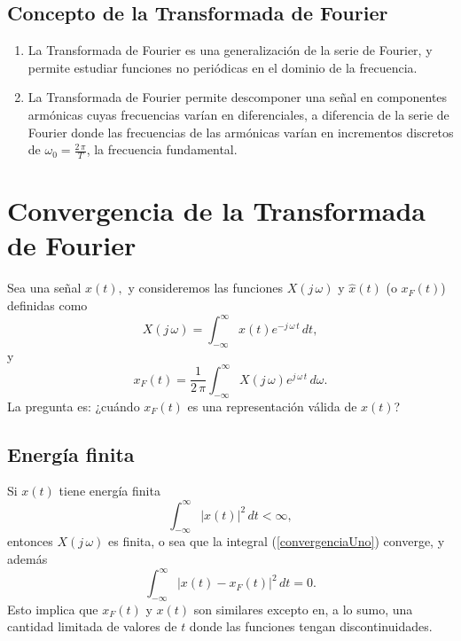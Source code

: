 \subsection{Concepto de la Transformada de Fourier}

\begin{enumerate}
	
	\item La Transformada de Fourier es una generalización de la serie de Fourier, y permite estudiar funciones no periódicas en el dominio de la frecuencia.
	\item La Transformada de Fourier permite descomponer una señal en componentes armónicas cuyas frecuencias varían en diferenciales, a diferencia de la serie de Fourier donde las frecuencias de las armónicas varían en incrementos discretos de $\omega_{0} = \frac{2 \, \pi}{T}$, la frecuencia fundamental.
\end{enumerate}

\section{Convergencia de la Transformada de Fourier}

Sea una señal $x(t),$ y consideremos las funciones $X(j \, \omega)$ y $\hat{x}(t)$ (o $x_F(t)$) definidas como 
\begin{equation}
	X(j \, \omega) = \int_{-\infty}^{\infty} x(t) e^{-j \, \omega \, t} \, dt,  \label{convergenciaUno}
\end{equation}
y 
\begin{equation}
	x_{F}(t) = \frac{1}{2 \, \pi} \int_{-\infty}^{\infty} X(j \, \omega) e^{j \, \omega \, t} \, d\omega .
\end{equation}
La pregunta es: ¿cuándo $x_{F}(t)$ es una representación válida de $x(t)$?

\subsection{Energía finita}

Si $x(t)$ tiene energía finita 
\begin{equation}
	\int_{-\infty}^{\infty} |x(t)|^{2} \, dt < \infty ,
\end{equation}
entonces $X(j \, \omega)$ es finita, o sea que la integral (\ref{convergenciaUno}) converge, y además 
\begin{equation}
	\int_{-\infty}^{\infty} |x(t) - x_{F}(t)|^{2} \, dt = 0.
\end{equation}
Esto implica que $x_{F}(t)$ y $x(t)$ son similares excepto en, a lo sumo, una cantidad limitada de valores de $t$ donde las funciones tengan discontinuidades.

